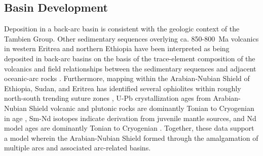 \subsection{Basin Development}

Deposition in a back-arc basin is consistent with the geologic context of the Tambien Group. Other sedimentary sequences overlying ca. 850-800~Ma volcanics in western Eritrea and northern Ethiopia have been interpreted as being deposited in back-arc basins on the basis of the trace-element composition of the volcanics and field relationships between the sedimentary sequences and adjacent oceanic-arc rocks \citep{Tadesse1999a, Teklay2003a, Teklay2006a}. Furthermore, mapping within the Arabian-Nubian Shield of Ethiopia, Sudan, and Eritrea has identified several ophiolites within roughly north-south trending suture zones \citep{Berhe1990a}, U-Pb crystallization ages from Arabian-Nubian Shield volcanic and plutonic rocks are dominantly Tonian to Cryogenian in age \citep{Johnson2014a}, Sm-Nd isotopes indicate derivation from juvenile mantle sources, and Nd model ages are dominantly Tonian to Cryogenian \citep{Johnson2014a}. Together, these data support a model wherein the Arabian-Nubian Shield formed through the amalgamation of multiple arcs and associated arc-related basins.

